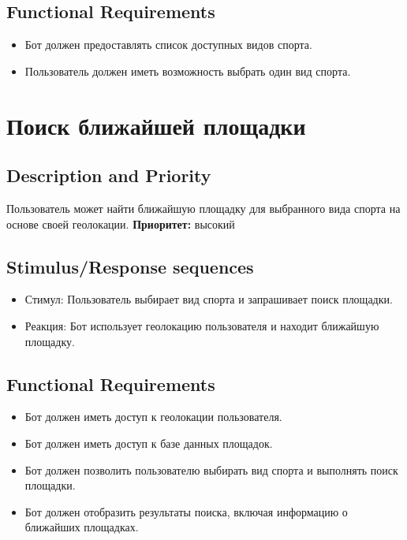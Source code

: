 \documentclass{scrreprt}
\begin{document}
\subsection{Functional Requirements}
\begin{itemize}
    \item Бот должен предоставлять список доступных видов спорта.
    \item Пользователь должен иметь возможность выбрать один вид спорта.
\end{itemize}

\section{Поиск ближайшей площадки}

\subsection{Description and Priority}
Пользователь может найти ближайшую площадку для выбранного вида спорта на основе своей геолокации.
\newline
\textbf{Приоритет:} высокий

\subsection{Stimulus/Response sequences}
\begin{itemize}
    \item Стимул: Пользователь выбирает вид спорта и запрашивает поиск площадки.
    \item Реакция: Бот использует геолокацию пользователя и находит ближайшую площадку.
\end{itemize}

\subsection{Functional Requirements}
\begin{itemize}
    \item Бот должен иметь доступ к геолокации пользователя.
    \item Бот должен иметь доступ к базе данных площадок.
    \item Бот должен позволить пользователю выбирать вид спорта и выполнять поиск площадки.
    \item Бот должен отобразить результаты поиска, включая информацию о ближайших площадках.
\end{itemize}
\end{document}
